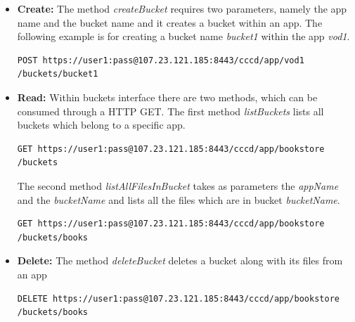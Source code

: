 \begin{itemize}
\item \textbf{Create:} The method \textit{createBucket} requires two parameters, namely the app name and the bucket name and it creates a bucket within an app. The following example is for creating a bucket name \textit{bucket1} within the app \textit{vod1}.

\begin{code}
\begin{verbatim}
POST https://user1:pass@107.23.121.185:8443/cccd/app/vod1
/buckets/bucket1
\end{verbatim}
\end{code}


\item \textbf{Read:} Within buckets interface there are two methods, which can be consumed through a \ac{HTTP} GET. The first method \textit{listBuckets} lists all buckets which belong to a specific app. 

\begin{code}
\begin{verbatim}
GET https://user1:pass@107.23.121.185:8443/cccd/app/bookstore
/buckets
\end{verbatim}
\end{code}

The second method \textit{listAllFilesInBucket} takes as parameters the \textit{appName} and the \textit{bucketName} and lists all the files which are in bucket \textit{bucketName}.

\begin{code}
\begin{verbatim}
GET https://user1:pass@107.23.121.185:8443/cccd/app/bookstore
/buckets/books
\end{verbatim}
\end{code}


\item \textbf{Delete:} The method \textit{deleteBucket} deletes a bucket along with its files from an app 

\begin{code}
\begin{verbatim}
DELETE https://user1:pass@107.23.121.185:8443/cccd/app/bookstore
/buckets/books
\end{verbatim}
\end{code}

\end{itemize}

